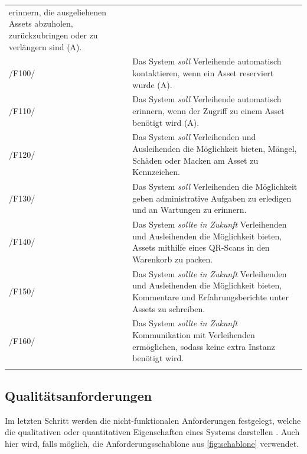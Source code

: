 \begin{center}
\begin{longtable}{lp{}}
                 erinnern, die ausgeliehenen Assets abzuholen, zurückzubringen oder zu verlängern
                 sind (A). \\
                 \sffamily\color{maincolor}/F100/  & Das System \textit{soll} Verleihende
                 automatisch kontaktieren, wenn ein Asset reserviert wurde (A). \\
                 \sffamily\color{maincolor}/F110/  & Das System \textit{soll} Verleihende
                 automatisch erinnern, wenn der Zugriff zu einem Asset benötigt wird (A). \\
                 \sffamily\color{maincolor}/F120/ & Das System \textit{soll} Verleihenden und
                 Ausleihenden die Möglichkeit bieten, Mängel, Schäden oder Macken am Asset zu
                 Kennzeichen. \\
                 \sffamily\color{maincolor}/F130/  & Das System \textit{soll} Verleihenden die
                 Möglichkeit geben administrative Aufgaben zu erledigen und an Wartungen zu
                 erinnern. \\
                 \sffamily\color{maincolor}/F140/ &   Das System \textit{sollte in Zukunft}
                 Verleihenden und Ausleihenden die Möglichkeit bieten, Assets mithilfe eines
                 QR-Scans in den Warenkorb zu packen.\\
                 \sffamily\color{maincolor}/F150/  & Das System \textit{sollte in Zukunft}
                 Verleihenden und Ausleihenden die Möglichkeit bieten, Kommentare und
                 Erfahrungsberichte unter Assets zu schreiben. \\
                 \sffamily\color{maincolor}/F160/ & Das System \textit{sollte in Zukunft}
                 Kommunikation mit Verleihenden ermöglichen, sodass keine extra Instanz benötigt
                 wird. \\
                \arrayrulecolor{maincolor}\hline
        \end{longtable}
\end{center}

\vspace*{-1.5cm}
\subsection{Qualitätsanforderungen}
\label{section:qualität}
Im letzten Schritt werden die nicht-funktionalen Anforderungen festgelegt, welche die qualitativen
oder quantitativen Eigenschaften eines Systems darstellen \cite{balzert2009}. Auch hier wird, falls
möglich, die Anforderungsschablone aus \ref{fig:schablone} verwendet.

